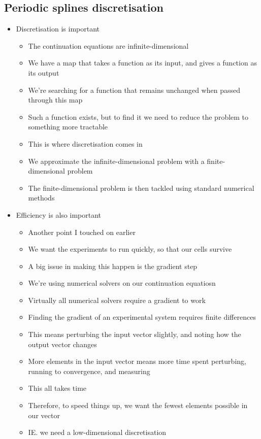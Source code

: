 \documentclass[11pt]{article}
\begin{document}
\subsection{Periodic splines discretisation}
\label{sec:org8f57c54}
\begin{itemize}
\item Discretisation is important
\begin{itemize}
\item The continuation equations are infinite-dimensional
\item We have a map that takes a function as its input, and gives a function as its output
\item We're searching for a function that remains unchanged when passed through this map
\item Such a function exists, but to find it we need to reduce the problem to something more tractable
\item This is where discretisation comes in
\item We approximate the infinite-dimensional problem with a finite-dimensional problem
\item The finite-dimensional problem is then tackled using standard numerical methods
\end{itemize}

\item Efficiency is also important
\begin{itemize}
\item Another point I touched on earlier
\item We want the experiments to run quickly, so that our cells survive
\item A big issue in making this happen is the gradient step
\item We're using numerical solvers on our continuation equatiosn
\item Virtually all numerical solvers require a gradient to work
\item Finding the gradient of an experimental system requires finite differences
\item This means perturbing the input vector slightly, and noting how the output vector changes
\item More elements in the input vector means more time spent perturbing, running to convergence, and measuring
\item This all takes time
\item Therefore, to speed things up, we want the fewest elements possible in our vector
\item IE. we need a low-dimensional discretisation
\end{itemize}


\end{itemize}
\end{document}
